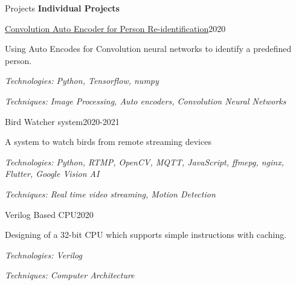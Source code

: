 \documentclass{resume} %
\begin{document}
\begin{rSection}{Projects}
\textbf{Individual Projects}\\

\begin{rSubsection}{\href{https://github.com/HeshanDissanayake/Convolutional_Auto_encoder}{Convolution Auto Encoder for Person Re-identification}}{2020}{}{}
\item Using Auto Encodes for Convolution neural networks to identify a predefined person. \item 
\textit{Technologies: Python, Tensorflow, numpy}
\item \textit{Techniques: Image Processing, Auto encoders, Convolution Neural Networks}
\end{rSubsection}

\begin{rSubsection}{Bird Watcher system}{2020-2021}{}{}
\item A system to watch birds from remote streaming devices \item 
\textit{Technologies: Python, RTMP, OpenCV, MQTT, JavaScript, ffmepg, nginx, Flutter, Google Vision AI}
\item \textit{Techniques: Real time video streaming, Motion Detection}
\end{rSubsection}


\begin{rSubsection}{Verilog Based CPU}{2020}{}{}
\item Designing of a 32-bit CPU which supports simple instructions with caching. \item 
\textit{Technologies: Verilog}
\item \textit{Techniques: Computer Architecture }
\end{rSubsection}


\end{rSection}


\end{document}
